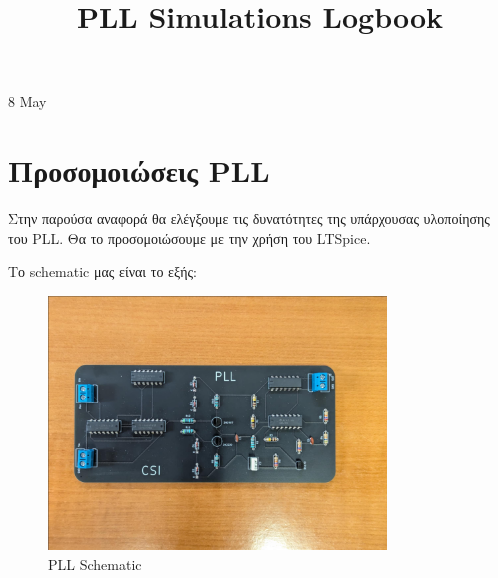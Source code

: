 \documentclass[11pt,letterpaper]{article}
\begin{document}
\univlogo

\title{PLL Simulations Logbook}

{\Huge 8 May}\\[5mm]

\section*{Προσομοιώσεις PLL}
Στην παρούσα αναφορά θα ελέγξουμε τις δυνατότητες της υπάρχουσας υλοποίησης του PLL.
Θα το προσομοιώσουμε με την χρήση του LTSpice.

Το schematic μας είναι το εξής:
\begin{figure}[H]
  \centering
  \includegraphics[width=0.8\textwidth]{PLL.png}
  \caption{PLL Schematic}
  \label{fig:pll_schematic}
\end{figure}
\end{document}
